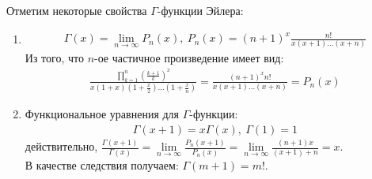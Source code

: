 Отметим некоторые свойства $\Gamma$-функции Эйлера:
\begin{enumerate}
  \item
    \begin{gather}
      \Gamma(x) = \lim\limits_{n \to \infty} P_n(x), \ P_n(x) = (n+1)^x
      \frac{n!}{x(x+1)\dots(x+n)}
      \label{ch92:eq2}
    \end{gather}
    Из того, что $n$-ое частичное произведение имеет вид:
    \begin{gather*}
      \frac{\prod\limits_{k = 1}^n \left(\frac{k + 1}{k}\right)^x}{x(1 + x)(1 +
      \frac{x}{2})\dots(1+\frac{x}{n})} = \frac{(n + 1)^x n!}{x(x + 1) \dots (x
      +n)} = P_n(x)
    \end{gather*}
  \item Функциональное уравнения для $\Gamma$-функции:
    \begin{gather}
      \Gamma(x + 1) = x \Gamma(x), \ \Gamma(1) = 1
      \label{ch92:eq3}
    \end{gather}
    действительно, $\frac{\Gamma(x + 1)}{\Gamma(x)} = \lim\limits_{n \to
    \infty} \frac{P_n(x + 1)}{P_n(x)} = \lim\limits_{n \to \infty} \frac{(n +
    1)x}{(x + 1) + n} = x$. \\
    В качестве следствия получаем: $\Gamma(m + 1) = m!$.
\end{enumerate}

